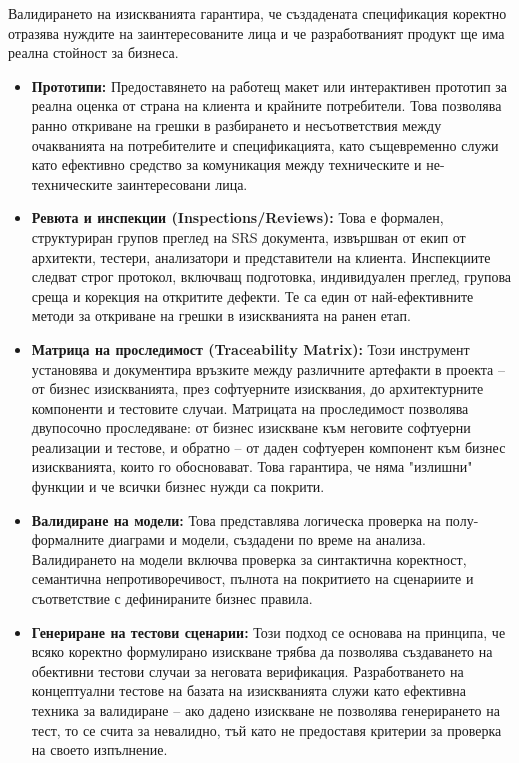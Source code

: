 \documentclass{scrartcl}
\begin{document}
\begin{FlushLeft}
Валидирането на изискванията гарантира, че създадената спецификация коректно отразява нуждите на заинтересованите лица и че разработваният продукт ще има реална стойност за бизнеса.

\begin{itemize}
    \item \textbf{Прототипи:} Предоставянето на работещ макет или интерактивен прототип за реална оценка от страна на клиента и крайните потребители. Това позволява ранно откриване на грешки в разбирането и несъответствия между очакванията на потребителите и спецификацията, като същевременно служи като ефективно средство за комуникация между техническите и не-техническите заинтересовани лица.
    
    \item \textbf{Ревюта и инспекции (Inspections/Reviews):} Това е формален, структуриран групов преглед на SRS документа, извършван от екип от архитекти, тестери, анализатори и представители на клиента. Инспекциите следват строг протокол, включващ подготовка, индивидуален преглед, групова среща и корекция на откритите дефекти. Те са един от най-ефективните методи за откриване на грешки в изискванията на ранен етап.
    
    \item \textbf{Матрица на проследимост (Traceability Matrix):} Този инструмент установява и документира връзките между различните артефакти в проекта -- от бизнес изискванията, през софтуерните изисквания, до архитектурните компоненти и тестовите случаи. Матрицата на проследимост позволява двупосочно проследяване: от бизнес изискване към неговите софтуерни реализации и тестове, и обратно -- от даден софтуерен компонент към бизнес изискванията, които го обосновават. Това гарантира, че няма "излишни" функции и че всички бизнес нужди са покрити.
    
    \item \textbf{Валидиране на модели:} Това представлява логическа проверка на полу-формалните диаграми и модели, създадени по време на анализа. Валидирането на модели включва проверка за синтактична коректност, семантична непротиворечивост, пълнота на покритието на сценариите и съответствие с дефинираните бизнес правила.
    
    \item \textbf{Генериране на тестови сценарии:} Този подход се основава на принципа, че всяко коректно формулирано изискване трябва да позволява създаването на обективни тестови случаи за неговата верификация. Разработването на концептуални тестове на базата на изискванията служи като ефективна техника за валидиране -- ако дадено изискване не позволява генерирането на тест, то се счита за невалидно, тъй като не предоставя критерии за проверка на своето изпълнение.
\end{itemize}


\end{FlushLeft}
\end{document}
